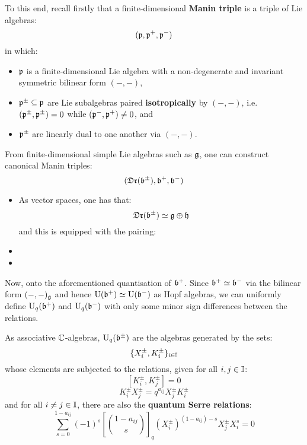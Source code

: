         To this end, recall firstly that a finite-dimensional \textbf{Manin triple} is a triple of Lie algebras:
            $$(\mathfrak{p}, \mathfrak{p}^+, \mathfrak{p}^-)$$
        in which:
        \begin{itemize}
            \item $\mathfrak{p}$ is a finite-dimensional Lie algebra with a non-degenerate and invariant symmetric bilinear form $(-, -)$,
            \item $\mathfrak{p}^{\pm} \subseteq \mathfrak{p}$ are Lie subalgebras paired \textbf{isotropically} by $(-, -)$, i.e. $(\mathfrak{p}^{\pm}, \mathfrak{p}^{\pm}) = 0$ while $(\mathfrak{p}^-, \mathfrak{p}^+) \not = 0$, and
            \item $\mathfrak{p}^{\pm}$ are linearly dual to one another via $(-, -)$.
        \end{itemize}
        From finite-dimensional simple Lie algebras such as $\mathfrak{g}$, one can construct canonical Manin triples:
            $$(\mathfrak{Dr}(\mathfrak{b}^{\pm}), \mathfrak{b}^+, \mathfrak{b}^-)$$
        \begin{itemize}
            \item As vector spaces, one has that:
                $$\mathfrak{Dr}(\mathfrak{b}^{\pm}) \simeq \mathfrak{g} \oplus \mathfrak{h}$$
            and this is equipped with the pairing:
            \item 
            \item 
        \end{itemize}

        Now, onto the aforementioned quantisation of $\mathfrak{b}^+$. Since $\mathfrak{b}^+ \simeq \mathfrak{b}^-$ via the bilinear form $(-, -)_{\mathfrak{g}}$ and hence $\mathrm{U}(\mathfrak{b}^+) \simeq \mathrm{U}(\mathfrak{b}^-)$ as Hopf algebras, we can uniformly define $\mathrm{U}_q(\mathfrak{b}^+)$ and $\mathrm{U}_q(\mathfrak{b}^-)$ with only some minor sign differences between the relations. 
        \begin{definition} \label{def: quantum_borel_subalgebras}
            As associative $\mathbb{C}$-algebras, $\mathrm{U}_q(\mathfrak{b}^{\pm})$ are the algebras generated by the sets:
                $$\{ X_i^{\pm}, K_i^{\pm} \}_{i \in \mathbb{I}}$$
            whose elements are subjected to the relations, given for all $i, j \in \mathbb{I}$:
                $$[K_i^{\pm}, K_j^{\pm}] = 0$$
                $$K_i^{\pm} X_j^{\pm} = q^{a_{ij}} X_j^{\pm} K_i^{\pm}$$
            and for all $i \not = j \in \mathbb{I}$, there are also the \textbf{quantum Serre relations}:
                $$\sum_{s = 0}^{1 - a_{ij}} (-1)^s \left[\binom{1 - a_{ij}}{s}\right]_q (X_i^{\pm})^{(1 - a_{ij}) - s} X_j^{\pm} X_i^s = 0$$
        \end{definition}

